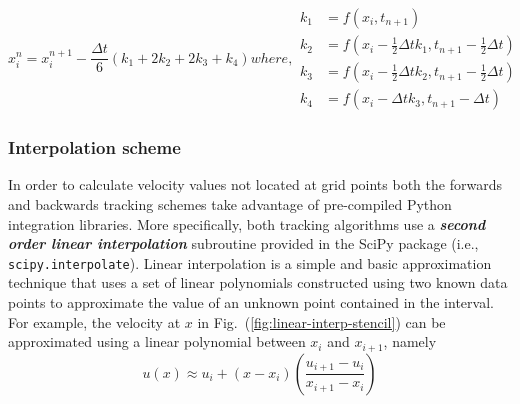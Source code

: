 \begin{subequations}
    \begin{equation}
        x^{n}_{i} = x^{n+1}_{i} 
                        - \frac{\Delta t}{6}
                        \left(k_{1} + 2 k_{2} + 2 k_{3} + k_{4} \right)
    \end{equation}
    where, 
    \begin{align}
        k_{1} & = f\left(x_{i}, t_{n+1}\right)  \\
        k_{2} & = f\left(x_{i} - \frac{1}{2}\Delta t k_{1}, t_{n+1}-\frac{1}{2} \Delta t\right) \\
        k_{3} & = f\left(x_{i} - \frac{1}{2}\Delta t k_{2}, t_{n+1}-\frac{1}{2} \Delta t\right) \\
        k_{4} & = f\left(x_{i} - \Delta t k_{3}, t_{n+1}- \Delta t\right)
    \end{align}
\end{subequations}

\subsubsection{Interpolation scheme}
In order to calculate velocity values not located at grid points both the
forwards and backwards tracking schemes take advantage of pre-compiled
Python integration libraries. More specifically, both tracking algorithms
use a \emph{\textbf{second order linear interpolation}} subroutine provided
in the SciPy package (i.e., \texttt{scipy.interpolate}). Linear
interpolation is a simple and basic approximation technique that uses a set
of linear polynomials constructed using two known data points to
approximate the value of an unknown point contained in the interval. For
example, the velocity at $x$ in Fig.~(\ref{fig:linear-interp-stencil}) can
be approximated using a linear polynomial between $x_{i}$ and $x_{i+1}$,
namely
\begin{equation}
    u(x) \approx u_{i} + \left(x-x_{i}\right) 
                    \left(\frac{u_{i+1} - u_{i}}{x_{i+1} - x_{i}}\right) 
\end{equation}

